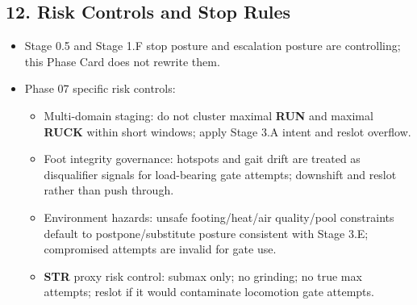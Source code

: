 \documentclass[10pt]{article}
\begin{document}
\subsection*{12. Risk Controls and Stop Rules}

\begin{itemize}
\item Stage 0.5 and Stage 1.F stop posture and escalation posture are controlling; this Phase Card does not rewrite them.
\item Phase 07 specific risk controls:
  \begin{itemize}
  \item Multi-domain staging: do not cluster maximal \textbf{RUN} and maximal \textbf{RUCK} within short windows; apply Stage 3.A intent and reslot overflow.
  \item Foot integrity governance: hotspots and gait drift are treated as disqualifier signals for load-bearing gate attempts; downshift and reslot rather than push through.
  \item Environment hazards: unsafe footing/heat/air quality/pool constraints default to postpone/substitute posture consistent with Stage 3.E; compromised attempts are invalid for gate use.
  \item \textbf{STR} proxy risk control: submax only; no grinding; no true max attempts; reslot if it would contaminate locomotion gate attempts.
  \end{itemize}
\end{itemize}
\end{document}
